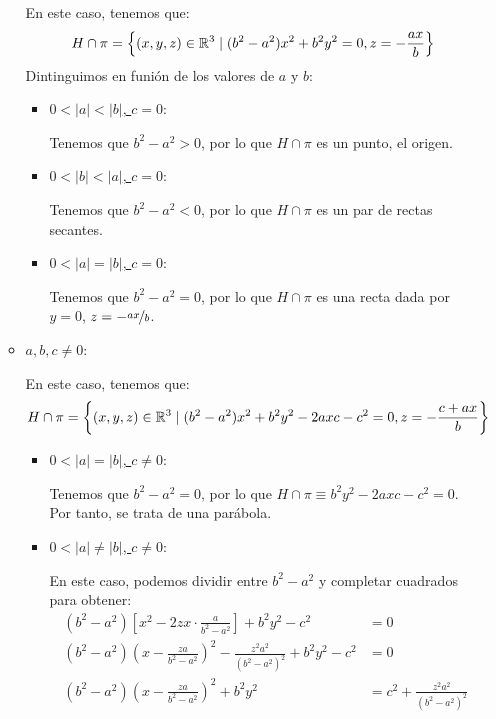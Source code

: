 \documentclass[12pt]{article}
\begin{document}
\begin{ejercicio}[3 puntos]
\begin{itemize}
\begin{itemize}
                En este caso, tenemos que:
                \begin{equation*}
                    H\cap \pi = \left\{(x,y,z)\in \mathbb{R}^3\mid (b^2-a^2)x^2+b^2y^2=0, z=-\frac{ax}{b}\right\}
                \end{equation*}
                Dintinguimos en funión de los valores de $a$ y $b$:
                \begin{itemize}
                    \item \ul{$0<|a|<|b|$, $c=0$}:
                    
                    Tenemos que $b^2-a^2>0$, por lo que $H\cap \pi$ es un punto, el origen.

                    \item \ul{$0<|b|<|a|$, $c=0$}:
                    
                    Tenemos que $b^2-a^2<0$, por lo que $H\cap \pi$ es un par de rectas secantes.

                    \item \ul{$0<|a|=|b|$, $c=0$}:
                    
                    Tenemos que $b^2-a^2=0$, por lo que $H\cap \pi$ es una recta dada por
                    $y=0$, $z=-\nicefrac{ax}{b}$.
                \end{itemize}

                \item \ul{$a,b, c\neq 0$}:
                
                En este caso, tenemos que:
                \begin{equation*}
                    H\cap \pi = \left\{(x,y,z)\in \mathbb{R}^3\mid (b^2-a^2)x^2+b^2y^2-2axc-c^2=0, z=-\frac{c+ax}{b}\right\}
                \end{equation*}

                \begin{itemize}
                    \item \ul{$0<|a|=|b|$, $c\neq 0$}:
                    
                    Tenemos que $b^2-a^2=0$, por lo que $H\cap \pi\equiv b^2y^2-2axc-c^2=0$.
                    Por tanto, se trata de una parábola.

                    \item \ul{$0<|a|\neq |b|$, $c\neq 0$}:
                    
                    En este caso, podemos dividir entre $b^2-a^2$ y completar cuadrados para
                    obtener:
                    \begin{align*}
                        (b^2-a^2)\left[x^2 -2zx \cdot \frac{a}{b^2-a^2}\right] + b^2y^2 - c^2 &= 0\\
                        (b^2-a^2)\left(x-\frac{za}{b^2-a^2}\right)^2 - \frac{z^2a^2}{(b^2-a^2)^2} + b^2y^2 - c^2 &= 0\\
                        (b^2-a^2)\left(x-\frac{za}{b^2-a^2}\right)^2 + b^2y^2 &= c^2 + \frac{z^2a^2}{(b^2-a^2)^2} \\
                    \end{align*}


\end{itemize}
\end{itemize}
\end{itemize}
\end{ejercicio}
\end{document}
